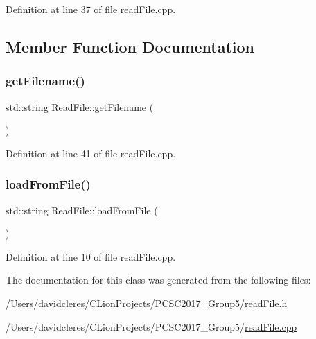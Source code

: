Definition at line 37 of file read\+File.\+cpp.



\subsection{Member Function Documentation}
\mbox{\label{class_read_file_a9835264c9ec95cfdbc1349573402fc01}} 
\subsubsection{\texorpdfstring{get\+Filename()}{getFilename()}}
{\footnotesize\ttfamily std\+::string Read\+File\+::get\+Filename (\begin{DoxyParamCaption}{ }\end{DoxyParamCaption})}







Definition at line 41 of file read\+File.\+cpp.

\mbox{\label{class_read_file_af5ca728cd9c884966d53e62ab4de483f}} 
\subsubsection{\texorpdfstring{load\+From\+File()}{loadFromFile()}}
{\footnotesize\ttfamily std\+::string Read\+File\+::load\+From\+File (\begin{DoxyParamCaption}{ }\end{DoxyParamCaption})}







Definition at line 10 of file read\+File.\+cpp.



The documentation for this class was generated from the following files\+:\begin{DoxyCompactItemize}
\item 
/\+Users/davidcleres/\+C\+Lion\+Projects/\+P\+C\+S\+C2017\+\_\+\+Group5/\mbox{\hyperlink{read_file_8h}{read\+File.\+h}}\item 
/\+Users/davidcleres/\+C\+Lion\+Projects/\+P\+C\+S\+C2017\+\_\+\+Group5/\mbox{\hyperlink{read_file_8cpp}{read\+File.\+cpp}}\end{DoxyCompactItemize}
